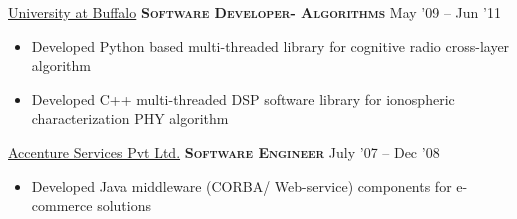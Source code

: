 \documentclass[10pt,a4paper]{article} %
\begin{document}

\headedsection %
{\href{http://www.ece.neu.edu/wineslab/}{University at Buffalo}}
{\textsc{\textbf{Software Developer- Algorithms}}} {May '09 -- Jun '11}
	\bodytext
	{
	  \begin{itemize}
		\item Developed Python based multi-threaded library for cognitive radio cross-layer algorithm
		\item Developed C++ multi-threaded DSP software library for ionospheric characterization PHY algorithm
	  \end{itemize}
	}


\headedsection %
{\href{http://www.accenture.com/}{Accenture Services Pvt Ltd.}}
{\textsc{\textbf{Software Engineer}}} {July '07 -- Dec '08}
	\bodytext
	{
	  \begin{itemize}
		\item Developed Java middleware (CORBA/ Web-service) components for e-commerce solutions
	  \end{itemize}
	}

\spacedhrule{0.5em}{-0.4em} %

\end{document}
